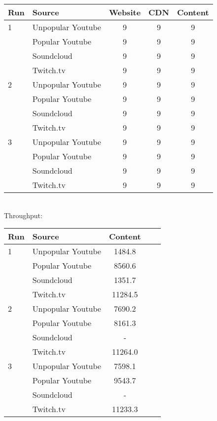 \documentclass{sig-alternate-05-2015}
\begin{document}
{\small
\begin{tabular}{|l|l|c|c|c|} \hline
Run & Source & Website & CDN & Content \\ \hline
1 & Unpopular Youtube & 9 & 9 & 9 \\ \hline
  & Popular Youtube   & 9 & 9 & 9 \\ \hline
  & Soundcloud        & 9 & 9 & 9 \\ \hline
  & Twitch.tv         & 9 & 9 & 9 \\ \hline
2 & Unpopular Youtube & 9 & 9 & 9 \\ \hline
  & Popular Youtube   & 9 & 9 & 9 \\ \hline
  & Soundcloud        & 9 & 9 & 9 \\ \hline
  & Twitch.tv         & 9 & 9 & 9 \\ \hline
3 & Unpopular Youtube & 9 & 9 & 9 \\ \hline
  & Popular Youtube   & 9 & 9 & 9 \\ \hline
  & Soundcloud        & 9 & 9 & 9 \\ \hline
  & Twitch.tv         & 9 & 9 & 9 \\ \hline
\end{tabular}}
\vspace{1em} \\
Throughput: \\
{\small
\begin{tabular}{|l|l|c|c|c|} \hline
Run & Source & Content \\ \hline
1 & Unpopular Youtube & 1484.8  \\ \hline
  & Popular Youtube   & 8560.6  \\ \hline
  & Soundcloud        & 1351.7  \\ \hline
  & Twitch.tv         & 11284.5 \\ \hline
2 & Unpopular Youtube & 7690.2  \\ \hline
  & Popular Youtube   & 8161.3  \\ \hline
  & Soundcloud        & -       \\ \hline
  & Twitch.tv         & 11264.0 \\ \hline
3 & Unpopular Youtube & 7598.1  \\ \hline
  & Popular Youtube   & 9543.7  \\ \hline
  & Soundcloud        & -       \\ \hline  
  & Twitch.tv         & 11233.3 \\ \hline
\end{tabular}}
\end{document}
